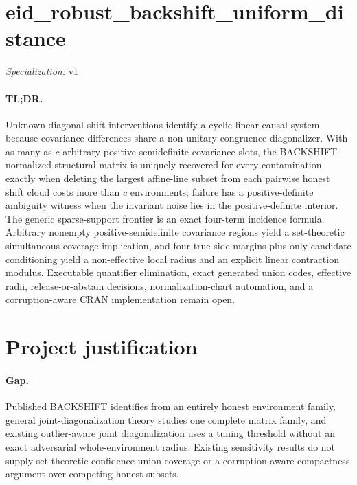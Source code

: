 \documentclass{article}
\begin{document}
\sloppy

\section*{eid\_\allowbreak{}robust\_\allowbreak{}backshift\_\allowbreak{}uniform\_\allowbreak{}distance}

\noindent\textit{Specialization:} v1\par

\paragraph{TL;DR.} Unknown diagonal shift interventions identify a cyclic linear causal system because covariance differences share a non-unitary congruence diagonalizer. With as many as \(c\) arbitrary positive-semidefinite covariance slots, the BACKSHIFT-normalized structural matrix is uniquely recovered for every contamination exactly when deleting the largest affine-line subset from each pairwise honest shift cloud costs more than \(c\) environments; failure has a positive-definite ambiguity witness when the invariant noise lies in the positive-definite interior. The generic sparse-support frontier is an exact four-term incidence formula. Arbitrary nonempty positive-semidefinite covariance regions yield a set-theoretic simultaneous-coverage implication, and four true-side margins plus only candidate conditioning yield a non-effective local radius and an explicit linear contraction modulus. Executable quantifier elimination, exact generated union codes, effective radii, release-or-abstain decisions, normalization-chart automation, and a corruption-aware CRAN implementation remain open.

\section{Project justification}

\paragraph{Gap.} Published BACKSHIFT identifies from an entirely honest environment family, general joint-diagonalization theory studies one complete matrix family, and existing outlier-aware joint diagonalization uses a tuning threshold without an exact adversarial whole-environment radius. Existing sensitivity results do not supply set-theoretic confidence-union coverage or a corruption-aware compactness argument over competing honest subsets.
\end{document}

